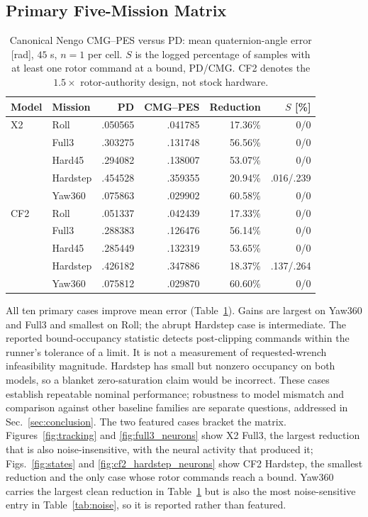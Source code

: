 \documentclass[letterpaper,10pt,conference]{IEEEtran}
\begin{document}
\subsection{Primary Five-Mission Matrix}
\begin{table}[h]
\caption{Canonical Nengo CMG--PES versus PD: mean quaternion-angle error
[rad], $45$ s, $n=1$ per cell. $S$ is the logged percentage of samples with
at least one rotor command at a bound, PD/CMG. CF2 denotes the $1.5\times$
rotor-authority design, not stock hardware.}
\label{tab:mujoco}\centering\scriptsize
\setlength{\tabcolsep}{3pt}
\begin{tabular}{llrrrr}
\toprule
Model&Mission&PD&CMG--PES&Reduction&$S$ [\%]\\\midrule
X2&Roll&.050565&.041785&17.36\%&0/0\\
&Full3&.303275&.131748&56.56\%&0/0\\
&Hard45&.294082&.138007&53.07\%&0/0\\
&Hardstep&.454528&.359355&20.94\%&.016/.239\\
&Yaw360&.075863&.029902&60.58\%&0/0\\\midrule
CF2&Roll&.051337&.042439&17.33\%&0/0\\
&Full3&.288383&.126476&56.14\%&0/0\\
&Hard45&.285449&.132319&53.65\%&0/0\\
&Hardstep&.426182&.347886&18.37\%&.137/.264\\
&Yaw360&.075812&.029870&60.60\%&0/0\\\bottomrule
\end{tabular}
\end{table}
All ten primary cases improve mean error (Table~\ref{tab:mujoco}). Gains
are largest on Yaw360 and Full3 and smallest on Roll; the abrupt Hardstep
case is intermediate. The reported bound-occupancy statistic detects
post-clipping commands within the runner's tolerance of a limit. It is not
a measurement of requested-wrench infeasibility magnitude. Hardstep has
small but nonzero occupancy on both models, so a blanket zero-saturation
claim would be incorrect. These cases establish repeatable nominal performance; robustness to model
mismatch and comparison against other baseline families are separate
questions, addressed in Sec.~\ref{sec:conclusion}. The two featured cases bracket the matrix. Figures~\ref{fig:tracking} and
\ref{fig:full3_neurons} show X2 Full3, the largest reduction that is also
noise-insensitive, with the neural activity that produced it;
Figs.~\ref{fig:states} and \ref{fig:cf2_hardstep_neurons} show CF2 Hardstep,
the smallest reduction and the only case whose rotor commands reach a bound.
Yaw360 carries the largest clean reduction in Table~\ref{tab:mujoco} but is
also the most noise-sensitive entry in Table~\ref{tab:noise}, so it is
reported rather than featured.
\end{document}
